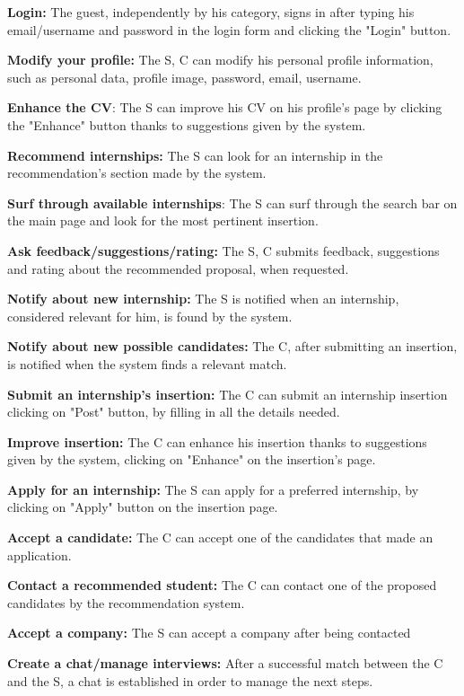 \textbf{Login:} The guest, independently by his category, signs in after
typing his email/username and password in the login form and clicking
the "Login" button.

\textbf{Modify your profile:} The S, C can modify his personal profile
information, such as personal data, profile image, password, email,
username.

\textbf{Enhance the CV}: The S can improve his CV on his
profile's page by clicking the "Enhance" button thanks
to suggestions given by the system.

\textbf{Recommend internships:} The S can look for an internship in the
recommendation's section made by the system.

\textbf{Surf through available internships}: The S can surf through the
search bar on the main page and look for the most pertinent insertion.

\textbf{Ask feedback/suggestions/rating:} The S, C submits feedback,
suggestions and rating about the recommended proposal, when requested.

\textbf{Notify about new internship:} The S is notified when an
internship, considered relevant for him, is found by the system.

\textbf{Notify about new possible candidates:} The C, after submitting
an insertion, is notified when the system finds a relevant match.

\textbf{Submit an internship's insertion:} The C can submit an
internship insertion clicking on "Post" button, by
filling in all the details needed.

\textbf{Improve insertion:} The C can enhance his insertion thanks to
suggestions given by the system, clicking on "Enhance" on the
insertion's page.

\textbf{Apply for an internship:} The S can apply for a preferred
internship, by clicking on "Apply" button on the insertion page.

\textbf{Accept a candidate:} The C can accept one of the candidates that
made an application.

\textbf{Contact a recommended student:} The C can contact one of the
proposed candidates by the recommendation system.

\textbf{Accept a company:} The S can accept a company after being
contacted

\textbf{Create a chat/manage interviews:} After a successful match
between the C and the S, a chat is established in order to manage the
next steps.

